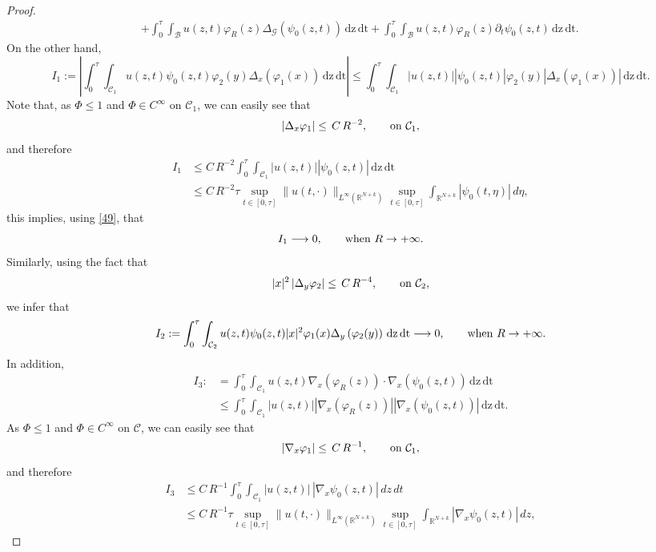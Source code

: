 \documentclass[reqno,11pt]{amsart}
\numberwithin{equation}{section}
\def\R{{\mathbb {R}}}
\def\R{\mathbb{R}}
\begin{document}
\begin{proof}
\begin{eqnarray}
		&&+\int_0^\tau\int_{\mathcal{B}}u(z,t)\varphi_R(z)\Delta_{\mathcal{G}}\left(\psi_0(z,t)\right)\,\mathrm{dz}\,\mathrm{dt}+\int_0^\tau\int_{\mathcal{B}}u(z,t)\varphi_R(z)\partial_t\psi_0(z,t)\,\mathrm{dz}\,\mathrm{dt}. \label{50}
	\end{eqnarray}
	On the other hand,
	$$I_1:=\left|\int_0^\tau\int_{\mathcal{C}_1}u(z,t)\psi_0(z,t)\varphi_2(y)\Delta_{x}\left(\varphi_1(x)\right)\,\mathrm{dz}\,\mathrm{dt}\right| \leq \int_0^\tau\int_{\mathcal{C}_1} |u(z,t)| |\psi_0(z,t)|\varphi_2(y)\left|\Delta_{x}\left(\varphi_1(x)\right)\right|\,\mathrm{dz}\,\mathrm{dt}.$$
	Note that, as $\Phi\leq1$ and $\Phi\in C^\infty$ on $\mathcal{C}_1$, we can easily see that
	$$\left|\Delta_x\varphi_1\right|\leq\,C\,{R^{-2}},\qquad\hbox{on}\,\,\mathcal{C}_1,$$
	and therefore
	\begin{align*}
		I_1&\leq C\,R^{-2}\int_0^\tau\int_{\mathcal{C}_1} |u(z,t)| |\psi_0(z,t)|\,\mathrm{dz}\,\mathrm{dt}\\
		& \leq C\,R^{-2}\tau\sup_{t\in[0,\tau]}\|u(t,\cdotp)\|_{L^\infty( \R^{N+k})}\sup_{t\in[0,\tau]}\int_{ \R^{N+k}}|\psi_0(t,\eta)|\,d\eta,\end{align*}
	this implies, using \eqref{49}, that
	\begin{equation}\label{46}
		I_1\longrightarrow 0,\qquad \hbox{when}\,\,R\rightarrow+\infty.
	\end{equation}
	Similarly, using the fact that
	$$|x|^2\left|\Delta_y\varphi_2\right|\leq\,C\,{R^{-4}},\qquad\hbox{on}\,\,\mathcal{C}_2,$$
	we infer that
	\begin{equation}\label{461}
		I_2:=\int_0^\tau\int_{\mathcal{C}_2}u(z,t)\psi_0(z,t)|x|^2\varphi_1(x)\Delta_{y}\left(\varphi_2(y)\right)\,\mathrm{dz}\,\mathrm{dt}\longrightarrow 0,\qquad \hbox{when}\,\,R\rightarrow+\infty.
	\end{equation}
	In addition, 
	\begin{align*}I_3:&=\int_0^\tau\int_{\mathcal{C}_1}u(z,t)\nabla_x(\varphi_R(z))\cdotp\nabla_x\left(\psi_0(z,t)\right)\,\mathrm{dz}\,\mathrm{dt} \\&\leq\int_0^\tau\int_{\mathcal{C}_1} |u(z,t)| \left|\nabla_x(\varphi_R(z))\right| \left|\nabla_x\left(\psi_0(z,t)\right)\right|\,\mathrm{dz}\,\mathrm{dt}.\end{align*}
	As $\Phi\leq1$ and $\Phi\in C^\infty$ on $\mathcal{C}$, we can easily see that
	$$\left|\nabla_x\varphi_1\right|\leq\,C\,{R^{-1}},\qquad\hbox{on}\,\,\mathcal{C}_1,$$
	and therefore
	\begin{align*}I_3&\leq C\,R^{-1}\int_0^\tau\int_{\mathcal{C}_1} |u(z,t)|  \,|\nabla_x\psi_0(z,t)|\,dz\,dt\\&\leq C\,R^{-1}\tau\sup_{t\in[0,\tau]}\|u(t,\cdotp)\|_{L^\infty( \R^{N+k})}\sup_{t\in[0,\tau]}\int_{ \R^{N+k}}|\nabla_x\psi_0(z,t)|\,dz,\end{align*}

\end{proof}
\end{document}

